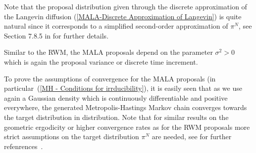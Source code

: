 \begin{rem}
 Note that the proposal distribution given through the discrete approximation of the Langevin diffusion (\ref{MALA-Discrete Approximation of Langevin}) is quite natural since it corresponds to a simplified second-order approximation of $ \pi^{N} $, see Section 7.8.5 in \autocite{Robert2005} for further details.
\end{rem} 

Similar to the RWM, the MALA proposals depend on the parameter $ \sigma^2 > 0 $ which is again the proposal variance or discrete time increment. 

To prove the assumptions of convergence for the MALA proposals (in particular~(\ref{MH - Conditions for irrducibility}), it is easily seen that as we use again a Gaussian density which is continuously differentiable and positive everywhere, the generated Metropolis-Hastings Markov chain converges towards the target distribution in distribution. Note that for similar results on the geometric ergodicity or higher convergence rates as for the RWM proposals more strict assumptions on the target distribution $ \pi^{N} $ are needed, see for further refenrences~\autocite{RobertsTweedie1996}.